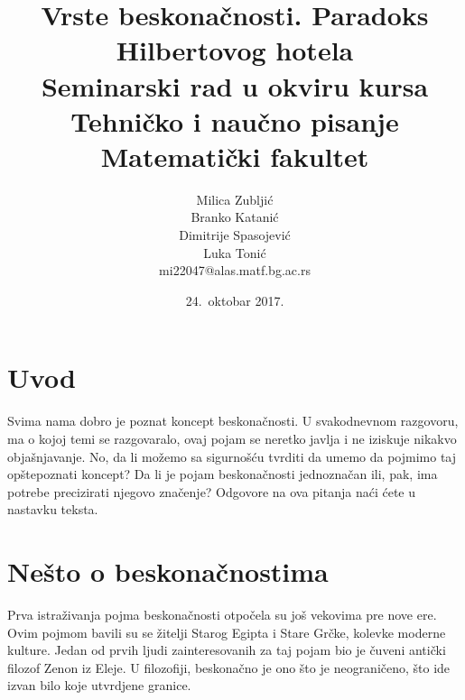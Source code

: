 \documentclass[a4paper]{article}
\begin{document}
\title{Vrste beskonačnosti. Paradoks Hilbertovog hotela\\ \small{Seminarski rad u okviru kursa\\Tehničko i naučno pisanje\\ Matematički fakultet}}

\author{Milica Zubljić\\ Branko Katanić\\ Dimitrije Spasojević\\ Luka Tonić\\ mi22047@alas.matf.bg.ac.rs}
\date{24.~oktobar 2017.} %
\maketitle


\tableofcontents %

\newpage

\section{Uvod}
\label{poglavlje:uvod}

Svima nama dobro je poznat koncept beskonačnosti. U svakodnevnom razgovoru, ma o kojoj temi se razgovaralo, ovaj pojam se neretko javlja i ne iziskuje nikakvo objašnjavanje. No, da li možemo sa sigurnošću tvrditi da umemo da pojmimo taj opštepoznati koncept? Da li je pojam beskonačnosti jednoznačan ili, pak, ima potrebe precizirati njegovo značenje? Odgovore na ova pitanja naći ćete u nastavku teksta.

\section{Nešto o beskonačnostima}
\label{poglavlje:Nešto o beskonačnostima}

Prva istraživanja pojma beskonačnosti otpočela su još vekovima pre nove ere. Ovim pojmom bavili su se žitelji Starog Egipta i Stare Grčke, kolevke moderne kulture. Jedan od prvih ljudi zainteresovanih za taj pojam bio je čuveni antički filozof Zenon iz Eleje. \cite{Zenon} U filozofiji, beskonačno je ono što je neograničeno, što ide izvan bilo koje utvrdjene granice.
\end{document}

